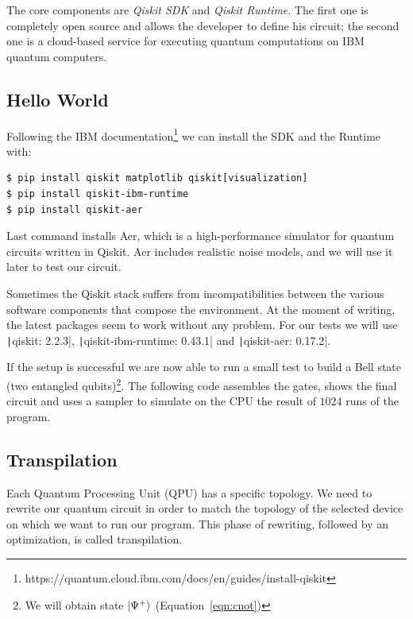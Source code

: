 The core components are \emph{Qiskit SDK} and \emph{Qiskit Runtime}. The first one is completely open source and allows the developer to define his circuit; the second one is a cloud-based service for executing quantum computations on IBM quantum computers.

\subsection{Hello World}
Following the IBM documentation\footnote{https://quantum.cloud.ibm.com/docs/en/guides/install-qiskit} we can install the SDK and the Runtime with:
\begin{center}
	\vspace{-.1cm}
	\begin{minipage}{.8\linewidth}
		\begin{verbatim}
$ pip install qiskit matplotlib qiskit[visualization]
$ pip install qiskit-ibm-runtime
$ pip install qiskit-aer
		\end{verbatim}
	\end{minipage}
\end{center}

Last command installs Aer, which is a high-performance simulator for quantum circuits written in Qiskit. Aer includes realistic noise models, and we will use it later to test our circuit.

Sometimes the Qiskit stack suffers from incompatibilities between the various software components that compose the environment. At the moment of writing, the latest packages seem to work without any problem. For our tests we will use \texttt|qiskit: 2.2.3|, \texttt|qiskit-ibm-runtime: 0.43.1| and \texttt|qiskit-aer: 0.17.2|.

If the setup is successful we are now able to run a small test to build a Bell state (two entangled qubits)\footnote{We will obtain state $\Ket{\Psi^+}$ (Equation~\ref{eqn:cnot})}. The following code assembles the gates, shows the final circuit and uses a sampler to simulate on the CPU the result of $1024$ runs of the program.

\begin{listingenv}[h]
	\caption{Building Bell state}
	\label{lst:hello_qiskit}
\end{listingenv}

\subsection{Transpilation}
\label{sec:transpilation}
Each Quantum Processing Unit (QPU) has a specific topology. We need to rewrite our quantum circuit in order to match the topology of the selected device on which we want to run our program. This phase of rewriting, followed by an optimization, is called transpilation.


